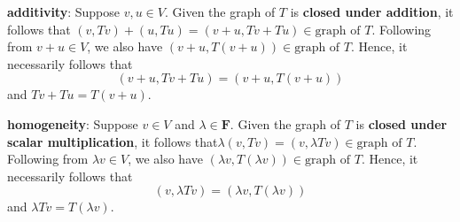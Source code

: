 \documentclass{article}
\begin{document}
\textbf{additivity}: Suppose $v,u\in V$. 
Given the graph of $T$ is \textbf{closed under addition}, it follows that $(v,Tv)+(u,Tu)=(v+u,Tv+Tu)\in \text{graph of }T$. 
Following from $v+u\in V$, we also have $(v+u,T(v+u))\in \text{graph of }T$. 
Hence, it necessarily follows that
\[(v+u,Tv+Tu)=(v+u,T(v+u))\]
and $Tv+Tu=T(v+u)$.

\textbf{homogeneity}: Suppose $v\in V$ and $\lambda\in \textbf{F}$. 
Given the graph of $T$ is \textbf{closed under scalar multiplication}, it follows that\newline $\lambda(v,Tv)=(v,\lambda Tv)\in \text{graph of }T$. 
Following from $\lambda v\in V$, we also have $(\lambda v,T(\lambda v))\in \text{graph of }T$. 
Hence, it necessarily follows that
\[(v,\lambda Tv)=(\lambda v,T(\lambda v))\]
and $\lambda Tv=T(\lambda v)$.
\end{document}

